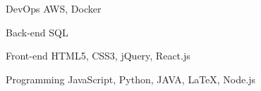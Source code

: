 

\begin{cvskills}

  \cvskill
    {DevOps} %
    {AWS, Docker} %

  \cvskill
    {Back-end} %
    {SQL} %

  \cvskill
    {Front-end} %
    {HTML5, CSS3, jQuery, React.js} %

  \cvskill
    {Programming} %
    {JavaScript, Python, JAVA, LaTeX, Node.js} %

\end{cvskills}
